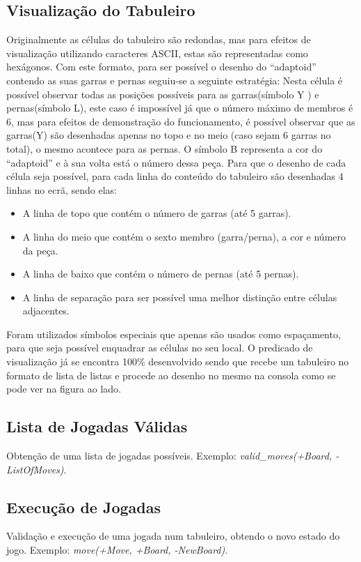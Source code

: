 \documentclass[a4paper]{article}
\begin{document}
\subsection{Visualização do Tabuleiro} Originalmente as células do tabuleiro são redondas, mas para efeitos de visualização utilizando caracteres ASCII, estas são representadas como hexágonos. Com este formato, para ser possível o desenho do “adaptoid” contendo as suas garras e pernas seguiu-se a seguinte estratégia: Nesta célula é possível observar todas as posições possíveis para as garras(símbolo Y ) e pernas(símbolo L), este caso é impossível já que o número máximo de membros é 6, mas para efeitos de demonstração do funcionamento, é possível observar que as garras(Y) são desenhadas apenas no topo e no meio (caso sejam 6 garras no total), o mesmo acontece para as pernas. O símbolo B representa a cor do “adaptoid” e à sua volta está o número dessa peça.
Para que o desenho de cada célula seja possível, para cada linha do conteúdo do tabuleiro são desenhadas 4 linhas no ecrã, sendo elas:
\begin{itemize}
    \item A linha de topo que contém o número de garras (até 5 garras).
    \item A linha do meio que contém o sexto membro (garra/perna), a cor e  número da peça.
    \item A linha de baixo que contém o número de pernas (até 5 pernas).
    \item A linha de separação para ser possível uma melhor distinção entre células adjacentes.
\end{itemize}
Foram utilizados símbolos especiais que apenas são usados como espaçamento, para que seja possível enquadrar as células no seu local. O predicado de visualização já se encontra 100\% desenvolvido sendo que recebe um tabuleiro no formato de lista de listas e procede ao desenho no mesmo na consola como se pode ver na figura ao lado.

\subsection{Lista de Jogadas Válidas} Obtenção de uma lista de jogadas possíveis. Exemplo: \textit{valid\_moves(+Board, -ListOfMoves)}.

\subsection{Execução de Jogadas} Validação e execução de uma jogada num tabuleiro, obtendo o novo estado do jogo. Exemplo: \textit{move(+Move, +Board, -NewBoard)}.
\end{document}
